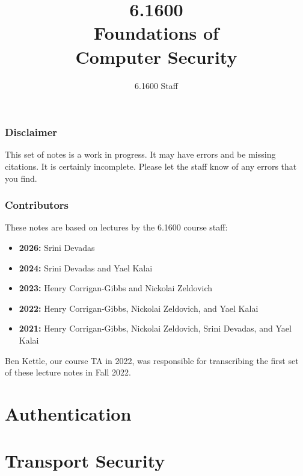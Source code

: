 \documentclass[
letterpaper, %
oneside,
nobib
]{tufte-book}
\author{6.1600 Staff}
\title{6.1600\\Foundations of\\Computer Security}
\begin{document}
\mainmatter

\maketitle

\section{Disclaimer}
This set of notes is a work in progress. It may have errors and be missing citations. It is certainly incomplete. Please let the staff know of any errors that you find.

\section{Contributors}
These notes are based on lectures by the 6.1600 course staff:
\begin{itemize}
  \item \textbf{2026:} Srini Devadas
  \item \textbf{2024:} Srini Devadas and Yael Kalai
  \item \textbf{2023:} Henry Corrigan-Gibbs and Nickolai Zeldovich
  \item \textbf{2022:} Henry Corrigan-Gibbs, Nickolai Zeldovich, and Yael Kalai
  \item \textbf{2021:} Henry Corrigan-Gibbs, Nickolai Zeldovich, Srini Devadas, and Yael Kalai
\end{itemize}
Ben Kettle, our course TA in 2022, was responsible for transcribing
the first set of these lecture notes in Fall 2022.

\clearpage

\tableofcontents*
\clearpage





\part{Authentication}








\part{Transport Security}






 
% 
\end{document}

